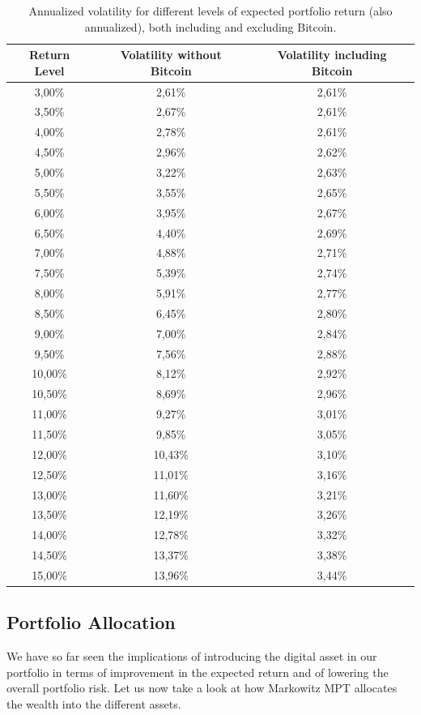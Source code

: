 \begin{table}
	\small
	\centering
	\caption[Markowitz efficient frontier on returns]{Annualized volatility for different levels of expected portfolio return (also annualized), both including and excluding Bitcoin.}
	\label{tab:markowitz_vol_on_ret}
\begin{tabular}{ccc}
	Return Level & Volatility without Bitcoin & Volatility including Bitcoin\\
	\midrule
	3,00\% & 2,61\% & 2,61\% \\
	3,50\% & 2,67\% & 2,61\% \\
	4,00\% & 2,78\% & 2,61\% \\
	4,50\% & 2,96\% & 2,62\% \\
	5,00\% & 3,22\% & 2,63\% \\
	5,50\% & 3,55\% & 2,65\% \\
	6,00\% & 3,95\% & 2,67\% \\
	6,50\% & 4,40\% & 2,69\% \\
	7,00\% & 4,88\% & 2,71\% \\
	7,50\% & 5,39\% & 2,74\% \\
	8,00\% & 5,91\% & 2,77\% \\
	8,50\% & 6,45\% & 2,80\% \\
	9,00\% & 7,00\% & 2,84\% \\
	9,50\% & 7,56\% & 2,88\% \\
	10,00\% & 8,12\% & 2,92\% \\
	10,50\% & 8,69\% & 2,96\% \\
	11,00\% & 9,27\% & 3,01\% \\
	11,50\% & 9,85\% & 3,05\% \\
	12,00\% & 10,43\% & 3,10\% \\
	12,50\% & 11,01\% & 3,16\% \\
	13,00\% & 11,60\% & 3,21\% \\
	13,50\% & 12,19\% & 3,26\% \\
	14,00\% & 12,78\% & 3,32\% \\
	14,50\% & 13,37\% & 3,38\% \\
	15,00\% & 13,96\% & 3,44\% \\
	\midrule
\end{tabular}

\end{table}





\subsection{Portfolio Allocation}
We have so far seen the implications of introducing the digital asset in our portfolio in terms of improvement in the expected return and of lowering the overall portfolio risk.
Let us now take a look at how Markowitz MPT allocates the wealth into the different assets.

